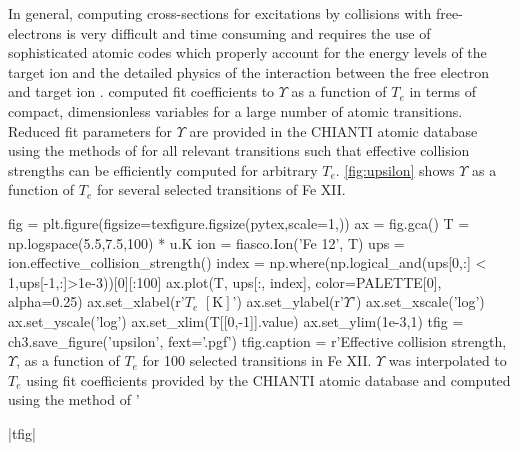 In general, computing cross-sections for excitations by collisions with free-electrons is very difficult and time consuming and requires the use of sophisticated atomic codes which properly account for the energy levels of the target ion and the detailed physics of the interaction between the free electron and target ion \citep[][section 4.2.3]{phillips_ultraviolet_2008,bautista_theoretical_2000}. \citet{burgess_analysis_1992} computed fit coefficients to $\Upsilon$ as a function of $T_e$ in terms of compact, dimensionless variables for a large number of atomic transitions. Reduced fit parameters for $\Upsilon$ are provided in the CHIANTI atomic database using the methods of \citet{burgess_analysis_1992} for all relevant transitions such that effective collision strengths can be efficiently computed for arbitrary $T_e$. \autoref{fig:upsilon} shows $\Upsilon$ as a function of $T_e$ for several selected transitions of Fe XII.

\begin{pycode}[chapter3]
fig = plt.figure(figsize=texfigure.figsize(pytex,scale=1,))
ax = fig.gca()
T = np.logspace(5.5,7.5,100) * u.K
ion = fiasco.Ion('Fe 12', T)
ups = ion.effective_collision_strength()
index = np.where(np.logical_and(ups[0,:] < 1,ups[-1,:]>1e-3))[0][:100]
ax.plot(T, ups[:, index], color=PALETTE[0], alpha=0.25)
ax.set_xlabel(r'$T_e$ $[\si{\kelvin}]$')
ax.set_ylabel(r'$\Upsilon$')
ax.set_xscale('log')
ax.set_yscale('log')
ax.set_xlim(T[[0,-1]].value)
ax.set_ylim(1e-3,1)
tfig = ch3.save_figure('upsilon', fext='.pgf')
tfig.caption = r'Effective collision strength, $\Upsilon$, as a function of $T_e$ for 100 selected transitions in Fe XII. $\Upsilon$ was interpolated to $T_e$ using fit coefficients provided by the CHIANTI atomic database and computed using the method of \citet{burgess_analysis_1992}'
\end{pycode}
\py[chapter3]|tfig|

